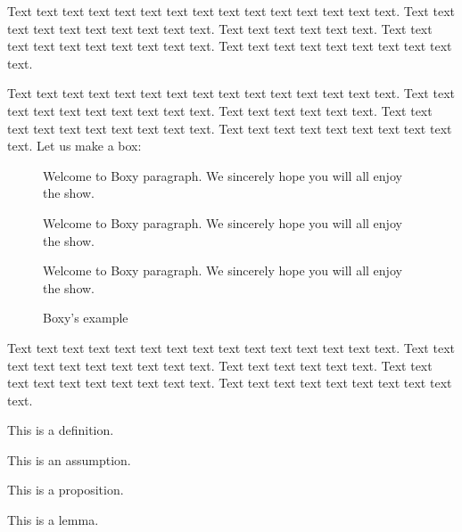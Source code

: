Text text text text text text text text text text text text text text text. Text text text text text text text text text text. Text text text text text text. Text text text text text text text text text text. Text text text text text text text text text text.



Text text text text text text text text text text text text text text text. Text text text text text text text text text text. Text text text text text text. Text text text text text text text text text text. Text text text text text text text text text text. Let us make a box:

\begin{figure}[!htbp]
\begin{center}
\caption{Boxy's example}\label{box:values}
\begin{boxeditemize}
	\item Welcome to Boxy paragraph. 
We sincerely hope you will
all enjoy the show.
	\item
Welcome to Boxy paragraph.
We sincerely hope you will
all enjoy the show.
	\item 
Welcome to Boxy paragraph.
We sincerely hope you will
all enjoy the show.
\end{boxeditemize}
\end{center}
\begin{source}\cite{Haaparanta1996}\end{source}
\end{figure}

Text text text text text text text text text text text text text text text. Text text text text text text text text text text. Text text text text text text. Text text text text text text text text text text. Text text text text text text text text text text.


\begin{defin}\label{de:definice1}
This is a definition.
\end{defin}

\begin{ass}\label{as:predpoklad1}
This is an assumption.
\end{ass}

\begin{prop}\label{pr:veta1}
This is a proposition.
\end{prop}

\begin{lemma}\label{le:lemma1}
This is a lemma.
\end{lemma}

